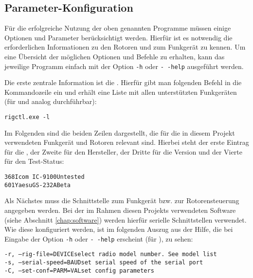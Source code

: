 \subsection{Parameter-Konfiguration}
\label{chap:hamlibconfig}

Für die erfolgreiche Nutzung der oben genannten Programme müssen einige Optionen und Parameter berücksichtigt werden. Hierfür ist es notwendig die erforderlichen Informationen zu den Rotoren und zum Funkgerät zu kennen. Um eine Übersicht der möglichen Optionen und Befehle zu erhalten, kann das jeweilige Programm einfach mit der Option \texttt{-h} oder \texttt{-\,-help} ausgeführt werden.

\clearpage

Die erste zentrale Information ist die . Hierfür gibt man folgenden Befehl in die Kommandozeile ein und erhält eine Liste mit allen unterstützten Funkgeräten (für  und  analog durchführbar):

\vspace{-1em}
\begin{shaded}
	\texttt{rigctl.exe -l}
\end{shaded}
\vspace{-1em}

Im Folgenden sind die beiden Zeilen dargestellt, die für die in diesem Projekt verwendeten Funkgerät und Rotoren relevant sind. Hierbei steht der erste Eintrag für die , der Zweite für den Hersteller, der Dritte für die Version und der Vierte für den Test-Status:

\vspace{-1em}
\begin{shaded}
	\texttt{368\qquad Icom\qquad\ IC-9100\qquad Untested}\\%
	\texttt{601\qquad Yaesu\qquad GS-232A\qquad Beta}
\end{shaded}
\vspace{-1em}

Als Nächstes muss die Schnittstelle zum Funkgerät bzw. zur Rotorensteuerung angegeben werden. Bei der im Rahmen diesen Projekts verwendeten Software (siehe Abschnitt \ref{chap:software}) werden hierfür serielle Schnittstellen verwendet. Wie diese konfiguriert werden, ist im folgenden Auszug aus der Hilfe, die bei Eingabe der Option \texttt{-h} oder \texttt{-\,-help} erscheint (für ), zu sehen:

\vspace{-1em}
\begin{shaded}
	 \texttt{-r, --rig-file=DEVICE\qquad \qquad select radio model number. See model list} \\%
	 \texttt{-s, --serial-speed=BAUD\qquad\quad set serial speed of the serial port} \\%
	 \texttt{-C, --set-conf=PARM=VAL\qquad \quad set config parameters}
\end{shaded}
\vspace{-1em}

